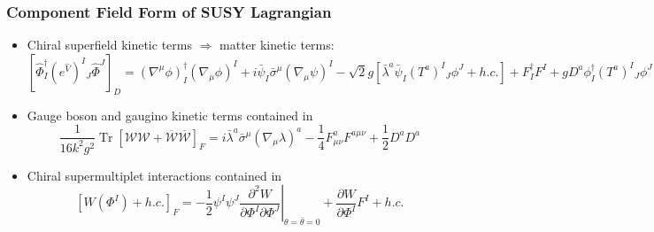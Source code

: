 \documentclass[10pt,aspectratio=169]{beamer}
\DeclareMathOperator{\Tr}{Tr}
\begin{document}
\begin{frame}
  \frametitle{Component Field Form of SUSY Lagrangian}
  \begin{itemize}\itemsep1em
    \item Chiral superfield kinetic terms $\Rightarrow$ matter kinetic terms:
      \begin{equation*}
        \left [ \hat{\Phi}^{\dagger}_I (e^{\hat{V}})^I{}_J
          \hat{\Phi}^J \right ]_D
        = (\nabla^\mu \phi)^{\dagger}_I(\nabla_\mu \phi)^I + i \bar{\psi}_I
        \bar{\sigma}^\mu (\nabla_\mu \psi)^I - \sqrt{2} g \left [
          \bar{\lambda}^a
          \bar{\psi}_I (T^a)^I{}_J \phi^J + h.c. \right ]
        + F^{\dagger}_I F^I + g D^a \phi^{\dagger}_I (T^a)^I{}_J
        \phi^J
      \end{equation*}
    \item Gauge boson and gaugino kinetic terms contained in
      \begin{equation*}
        \frac{1}{16 k^2 g^2} \Tr \left [
          \mathcal{W} \mathcal{W} + \overline{\mathcal{W}}
          \overline{\mathcal{W}}
          \right ]_F
        = i\bar{\lambda}^a \bar{\sigma}^\mu (\nabla_\mu \lambda)^a - \frac{1}{4}
        F^a_{\mu\nu} F^{a\mu\nu} + \frac{1}{2}D^a D^a
      \end{equation*}
    \item Chiral supermultiplet interactions contained in
      \begin{equation*}
        \left [ W(\Phi^I) + h.c. \right ]_F = -\frac{1}{2}
        \psi^I \psi^J \left . \frac{\partial^2 W}
            {\partial \Phi^I \partial \Phi^J} \right |_{\theta = \bar{\theta}
              = 0} + \frac{\partial W}{\partial \Phi^I} F^I + h.c.
      \end{equation*}
  \end{itemize}
\end{frame}
\end{document}
